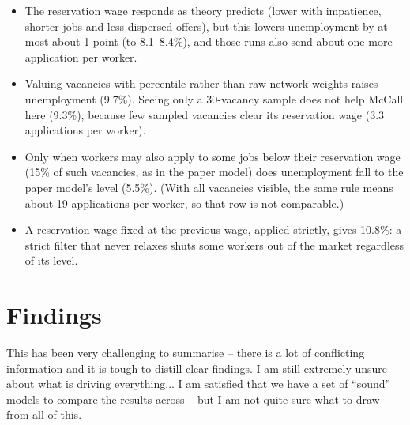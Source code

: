 \documentclass[10pt]{article}
\begin{document}
\normalsize
\smallskip
\begin{itemize}[leftmargin=*]
  \item The reservation wage responds as theory predicts (lower with impatience, shorter jobs and less dispersed
  offers), but this lowers unemployment by at most about 1 point (to 8.1--8.4\%), and those runs also send
  about one more application per worker.
  \item Valuing vacancies with percentile rather than raw network weights raises unemployment (9.7\%). Seeing
  only a 30-vacancy sample does not help McCall here (9.3\%), because few sampled vacancies clear its
  reservation wage (3.3 applications per worker).
  \item Only when workers may also apply to some jobs below their reservation wage (15\% of such vacancies, as in
  the paper model) does unemployment fall to the paper model's level (5.5\%). (With all vacancies visible,
  the same rule means about 19 applications per worker, so that row is not comparable.)
  \item A reservation wage fixed at the previous wage, applied strictly, gives 10.8\%: a strict filter that never
  relaxes shuts some workers out of the market regardless of its level.
\end{itemize}

\section{Findings}
This has been very challenging to summarise -- there is a lot of conflicting information and it is tough to
distill clear findings. I am still extremely unsure about what is driving everything... I am satisfied that we have a set of
``sound'' models to compare the results across -- but I am not quite sure what to draw from all of this.  
\end{document}
